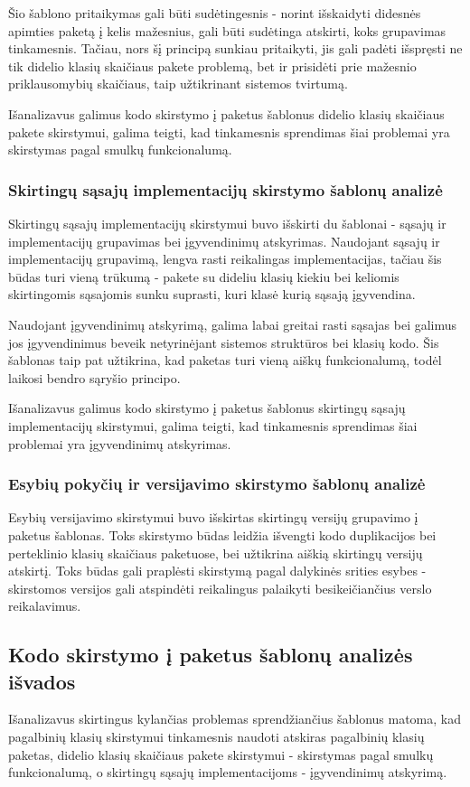 Šio šablono pritaikymas gali būti sudėtingesnis - norint išskaidyti didesnės apimties paketą į kelis mažesnius, gali būti
sudėtinga atskirti, koks grupavimas tinkamesnis.
Tačiau, nors šį principą sunkiau pritaikyti, jis gali padėti išspręsti ne tik didelio klasių skaičiaus pakete problemą,
bet ir prisidėti prie mažesnio priklausomybių skaičiaus, taip užtikrinant sistemos tvirtumą.

Išanalizavus galimus kodo skirstymo į paketus šablonus didelio klasių skaičiaus pakete skirstymui, galima teigti, kad tinkamesnis sprendimas šiai
problemai yra skirstymas pagal smulkų funkcionalumą.


\subsubsection{Skirtingų sąsajų implementacijų skirstymo šablonų analizė}
Skirtingų sąsajų implementacijų skirstymui buvo išskirti du šablonai - sąsajų ir implementacijų grupavimas bei
įgyvendinimų atskyrimas.
Naudojant sąsajų ir implementacijų grupavimą, lengva rasti reikalingas implementacijas, tačiau šis būdas
turi vieną trūkumą - pakete su dideliu klasių kiekiu bei keliomis skirtingomis sąsajomis sunku suprasti, kuri klasė kurią sąsają įgyvendina.

Naudojant įgyvendinimų atskyrimą, galima labai greitai rasti sąsajas bei galimus jos įgyvendinimus beveik netyrinėjant sistemos struktūros bei klasių kodo.
Šis šablonas taip pat užtikrina, kad paketas turi vieną aiškų funkcionalumą, todėl laikosi bendro sąryšio principo.

Išanalizavus galimus kodo skirstymo į paketus šablonus skirtingų sąsajų implementacijų skirstymui, galima teigti, kad tinkamesnis sprendimas šiai
problemai yra įgyvendinimų atskyrimas.

\subsubsection{Esybių pokyčių ir versijavimo skirstymo šablonų analizė}
Esybių versijavimo skirstymui buvo išskirtas skirtingų versijų grupavimo į paketus šablonas.
Toks skirstymo būdas leidžia išvengti kodo duplikacijos bei perteklinio klasių skaičiaus paketuose, bei užtikrina aiškią skirtingų versijų
atskirtį. Toks būdas gali praplėsti skirstymą pagal dalykinės srities esybes - skirstomos versijos gali atspindėti reikalingus
palaikyti besikeičiančius verslo reikalavimus.

\subsection{Kodo skirstymo į paketus šablonų analizės išvados}
Išanalizavus skirtingus kylančias problemas sprendžiančius šablonus matoma, kad
pagalbinių klasių skirstymui tinkamesnis naudoti atskiras pagalbinių klasių paketas,
didelio klasių skaičiaus pakete skirstymui - skirstymas pagal smulkų funkcionalumą,
o skirtingų sąsajų implementacijoms - įgyvendinimų atskyrimą.


